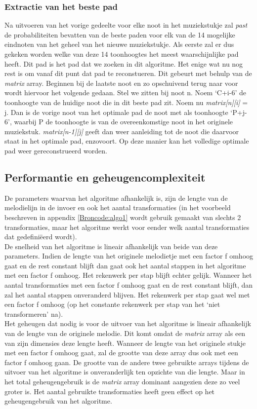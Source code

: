 \subsubsection{Extractie van het beste pad}
Na uitvoeren van het vorige gedeelte voor elke noot in het muziekstukje zal \textit{past} de probabiliteiten bevatten van de beste paden voor elk van de 14 mogelijke eindnoten van het geheel van het nieuwe muziekstukje. Als eerste zal er dus gekeken worden welke van deze 14 toonhoogtes het meest waarschijnlijke pad heeft. Dit pad is het pad dat we zoeken in dit algoritme. Het enige wat nu nog rest is om vanaf dit punt dat pad te reconstueren. Dit gebeurt met behulp van de \textit{matrix} array. Beginnen bij de laatste noot en zo opschuivend terug naar voor wordt hiervoor het volgende gedaan. Stel we zitten bij noot n. Noem `C+i-6' de toonhoogte van de huidige noot die in dit beste pad zit. Noem nu \textit{matrix[n][i]} = j. Dan is de vorige noot van het optimale pad de noot met als toonhoogte `P+j-6', waarbij P de toonhoogte is van de overeenkomstige noot in het originele muziekstuk. \textit{matrix[n-1][j]} geeft dan weer aanleiding tot de noot die daarvoor staat in het optimale pad, enzovoort. Op deze manier kan het volledige optimale pad weer gereconstrueerd worden.

\subsection{Performantie en geheugencomplexiteit}
De parameters waarvan het algoritme afhankelijk is, zijn de lengte van de melodielijn in de invoer en ook het aantal transformaties (in het voorbeeld beschreven in appendix \ref{Broncode:algo1} wordt gebruik gemaakt van slechts 2 transformaties, maar het algoritme werkt voor eender welk aantal transformaties dat gedefini\"eerd wordt).\\ 
De snelheid van het algoritme is lineair afhankelijk van beide van deze parameters. Indien de lengte van het originele melodietje met een factor f omhoog gaat en de rest constant blijft dan gaat ook het aantal stappen in het algoritme met een factor f omhoog. Het rekenwerk per stap blijft echter gelijk. Wanneer het aantal transformaties met een factor f omhoog gaat en de rest constant blijft, dan zal het aantal stappen onveranderd blijven. Het rekenwerk per stap gaat wel met een factor f omhoog (op het constante rekenwerk per stap van het `niet transformeren' na).\\
Het geheugen dat nodig is voor de uitvoer van het algoritme is lineair afhankelijk van de lengte van de originele melodie. Dit komt omdat de \textit{matrix} array als een van zijn dimensies deze lengte heeft. Wanneer de lengte van het originele stukje met een factor f omhoog gaat, zal de grootte van deze array dus ook met een factor f omhoog gaan. De grootte van de andere twee gebruikte arrays tijdens de uitvoer van het algoritme is onveranderlijk ten opzichte van die lengte. Maar in het total geheugengebruik is de \textit{matrix} array dominant aangezien deze zo veel groter is. Het aantal gebruikte transformaties heeft geen effect op het geheugengebruik van het algoritme.

